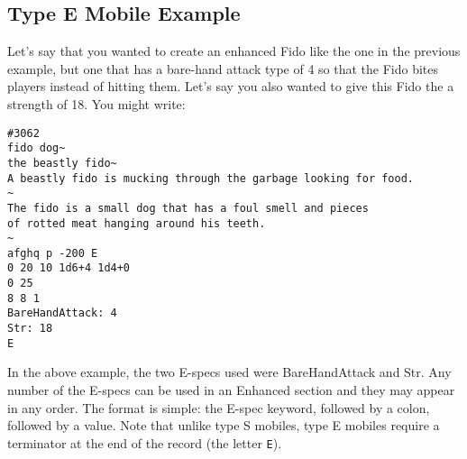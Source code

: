 \documentclass[11pt]{article}
\begin{document}
\subsection{Type E Mobile Example}
Let's say that you wanted to create an enhanced Fido like the one in the previous example, but one that has a bare-hand attack type of 4 so that the Fido bites players instead of hitting them.  Let's say you also wanted to give this Fido the a strength of 18.  You might write:
\begin{verbatim}
#3062
fido dog~
the beastly fido~
A beastly fido is mucking through the garbage looking for food.
~
The fido is a small dog that has a foul smell and pieces
of rotted meat hanging around his teeth.
~
afghq p -200 E
0 20 10 1d6+4 1d4+0
0 25
8 8 1
BareHandAttack: 4
Str: 18
E
\end{verbatim}
In the above example, the two E-specs used were BareHandAttack and Str.  Any number of the E-specs can be used in an Enhanced section and they may appear in any order.  The format is simple: the E-spec keyword, followed by a colon, followed by a value.  Note that unlike type S mobiles, type E mobiles require a terminator at the end of the record (the letter \texttt{E}).
\end{document}
